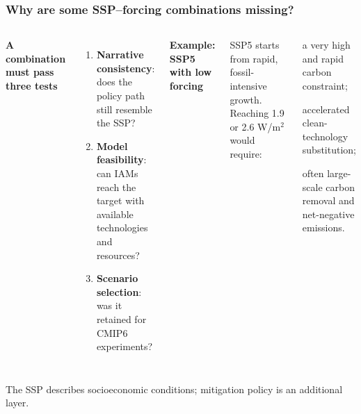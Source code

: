 \documentclass[xcolor=x11names,compress,aspectratio=169]{beamer}%
\makeatletter
\renewenvironment{itemize}{\begin{compactitemize}[<+-| alert@+>]}{\end{compactitemize}}
\makeatother
\begin{document}
\begin{frame}
\frametitle{Why are some SSP--forcing combinations missing?}

\begin{columns}[T,onlytextwidth]
{\color{black!75}\textbf{A combination must pass three tests}}
\vspace{0.25em}
\begin{enumerate}\small
\item \textbf{Narrative consistency}: does the policy path still resemble the SSP?
\item \textbf{Model feasibility}: can IAMs reach the target with available technologies and resources?
\item \textbf{Scenario selection}: was it retained for CMIP6 experiments?
\end{enumerate}

{\color{orange!85!black}\textbf{Example: SSP5 with low forcing}}
\vspace{0.25em}

\small SSP5 starts from rapid, fossil-intensive growth. Reaching 1.9 or
2.6 W/m$^2$ would require:
\begin{itemize}\small
\item a very high and rapid carbon constraint;
\item accelerated clean-technology substitution;
\item often large-scale carbon removal and net-negative emissions.
\end{itemize}
\end{columns}

\vspace{0.35em}
\centering
{}

\vspace{0.2em}
{\scriptsize The SSP describes socioeconomic conditions; mitigation policy is an additional layer.}
\end{frame}

%
\end{document}
